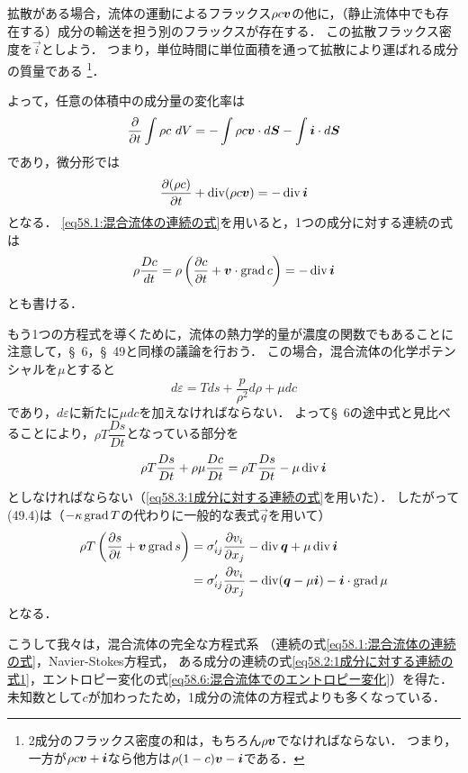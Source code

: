 拡散がある場合，流体の運動によるフラックス$\rho c \vb*{v}$の他に，（静止流体中でも存在する）成分の輸送を担う別のフラックスが存在する．
この拡散フラックス密度を$\vec{i}$としよう．
つまり，単位時間に単位面積を通って拡散により運ばれる成分の質量である
\footnote{2成分のフラックス密度の和は，もちろん$\rho\vb*{v}$でなければならない．
つまり，一方が$\rho c \vb*{v} +\vb*{i}$なら他方は$\rho(1-c)\vb*{v} -\vb*{i}$である．}．

よって，任意の体積中の成分量の変化率は
\[
    \pdv{}{t} \int \rho c \, \, dV = - \int \rho c\vb*{v} \cdot d\vb*{S} - \int \vb*{i} \cdot d\vb*{S} 
\]
であり，微分形では
\begin{equation}\label{eq58.2:1成分に対する連続の式1}
    \pdv{(\rho c)}{t} + \operatorname{div}(\rho c\vb*{v}) = - \operatorname{div} \vb*{i}
\end{equation}
となる．
\eqref{eq58.1:混合流体の連続の式}を用いると，1つの成分に対する連続の式は
\begin{equation}\label{eq58.3:1成分に対する連続の式}
    \rho\frac{Dc}{dt} = \rho \left( \pdv{c}{t} + \vb*{v} \cdot \operatorname{grad} c \right) = - \operatorname{div} \vb*{i}
\end{equation}
とも書ける．


もう1つの方程式を導くために，流体の熱力学的量が濃度の関数でもあることに注意して，\S~6，\S~49と同様の議論を行おう．
この場合，混合流体の化学ポテンシャルを$\mu$とすると
\[
    d\varepsilon = T ds + \frac{p}{\rho^2} d\rho + \mu dc
\]
であり，$d\varepsilon$に新たに$\mu dc$を加えなければならない．
よって\S~6の途中式と見比べることにより，$\rho T \dfrac{Ds}{Dt}$となっている部分を
\[
    \rho T \frac{Ds}{Dt} + \rho \mu \frac{Dc}{Dt}
    = \rho T \frac{Ds}{Dt} - \mu \operatorname{div} \vb*{i}
\]
としなければならない（\eqref{eq58.3:1成分に対する連続の式}を用いた）．
したがって(49.4)は（$-\kappa \operatorname{grad} T$の代わりに一般的な表式$\vec{q}$を用いて）
\setcounter{equation}{5}%
\begin{align}
    \rho T \left( \pdv{s}{t} + \vb*{v} \operatorname{grad} s \right) 
    &= \sigma_{ij}' \pdv{v_i}{x_j} - \operatorname{div} \vb*{q} + \mu \operatorname{div} \vb*{i} \nonumber\\
    &= \sigma_{ij}' \pdv{v_i}{x_j} - \operatorname{div} (\vb*{q} - \mu\vb*{i}) - \vb*{i} \cdot \operatorname{grad} \mu
    \label{eq58.6:混合流体でのエントロピー変化}
\end{align}
となる．


こうして我々は，混合流体の完全な方程式系
（連続の式\eqref{eq58.1:混合流体の連続の式}，Navier-Stokes方程式，
ある成分の連続の式\eqref{eq58.2:1成分に対する連続の式1}，エントロピー変化の式\eqref{eq58.6:混合流体でのエントロピー変化}）を得た．
未知数として$c$が加わったため，1成分の流体の方程式よりも多くなっている．


